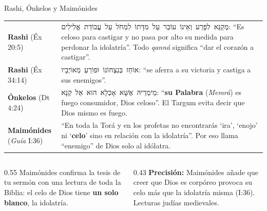 \documentclass[hyperref={bookmarks=false},aspectratio=169]{beamer}
\newcommand{\heb}[1]{\mbox{\foreignlanguage{hebrew}{#1}}}
\newcommand{\destacar}[1]{\textbf{\textcolor{azul}{#1}}}
\newcommand{\precision}[1]{{\footnotesize\color{gris}\textbf{Precisión:} #1}}
\begin{document}
\begin{frame}{Rashi, Ónkelos y Maimónides}
\scriptsize\renewcommand{\arraystretch}{1.18}
\begin{tabular}{@{}>{\RaggedRight\arraybackslash}p{2.3cm}>{\RaggedRight\arraybackslash}p{9.5cm}@{}}
\toprule
\textbf{Rashi} (Éx 20:5) & \heb{מְקַנֵּא לִפָּרַע וְאֵינוֹ עוֹבֵר עַל מִדָּתוֹ לִמְחֹל עַל עֲבוֹדַת אֱלִילִים}: ``Es celoso para castigar y no pasa por alto su medida para perdonar la idolatría''. Todo \emph{qanná} significa ``dar el corazón a castigar''. \\
\textbf{Rashi} (Éx 34:14) & \heb{אוֹחֵז בְּנִצְחוֹנוֹ וּפוֹרֵעַ מֵאוֹיְבָיו}: ``se aferra a su victoria y castiga a sus enemigos''. \\
\textbf{Ónkelos} (Dt 4:24) & \heb{מֵימְרֵיהּ אֶשָּׁא אָכְלָא הוּא אֵל קַנָּא}: ``\destacar{su Palabra} (\emph{Memrá}) es fuego consumidor, Dios celoso''. El Targum evita decir que Dios mismo es fuego. \\
\textbf{Maimónides} (\emph{Guía} I:36) & ``En toda la Torá y en los profetas no encontrarás `ira', `enojo' ni `\destacar{celo}' sino en relación con la idolatría''. Por eso llama ``enemigo'' de Dios solo al idólatra. \\
\bottomrule
\end{tabular}\par\medskip
\begin{columns}[t,onlytextwidth]
\begin{column}{0.55\textwidth}\small
Maimónides confirma la tesis de tu sermón con una lectura de toda la Biblia: el celo de Dios tiene \destacar{un solo blanco}, la idolatría.
\end{column}
\begin{column}{0.43\textwidth}
\precision{Maimónides añade que creer que Dios es corpóreo provoca su celo más que la idolatría misma (I:36). Lecturas judías medievales.}
\end{column}
\end{columns}
\end{frame}
\end{document}
